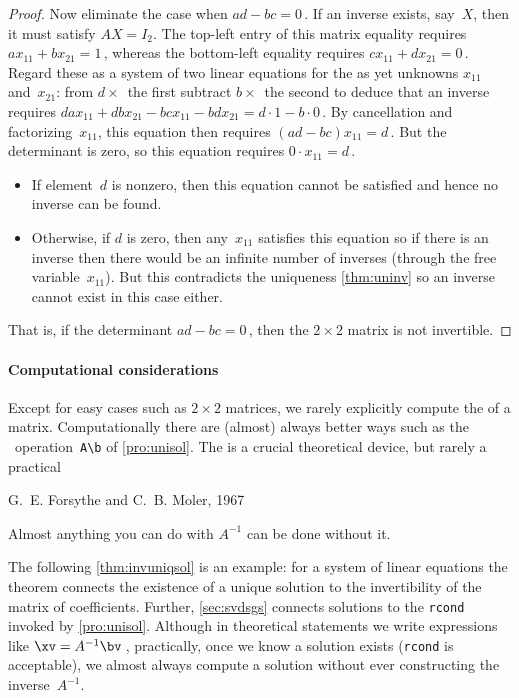 \begin{proof}
Now eliminate the case when \(ad-bc=0\)\,.
If an inverse exists, say~\(X\), then it must satisfy \(AX=I_2\).
The top-left entry of this matrix equality requires \(ax_{11}+bx_{21}=1\)\,, whereas the bottom-left equality requires \(cx_{11}+dx_{21}=0\)\,.
Regard these as a system of two linear equations for the as yet unknowns \(x_{11}\) and~\(x_{21}\): from \(d\times\)~the first subtract \(b\times\)~the second to deduce that an inverse requires
\(dax_{11}+dbx_{21}-bcx_{11}-bdx_{21}=d\cdot1-b\cdot0\)\,.
By cancellation and factorizing~\(x_{11}\), this equation then requires \((ad-bc)x_{11}=d\)\,.
But the determinant is zero, so this equation requires \(0\cdot x_{11}=d\)\,.
\begin{itemize}
\item If element~\(d\) is nonzero, then this equation cannot be satisfied and hence no inverse can be found.
\item Otherwise, if \(d\) is zero, then any~\(x_{11}\) satisfies this equation so if there is an inverse then there would be an infinite number of inverses (through the free variable~\(x_{11}\)).
But this contradicts the uniqueness \cref{thm:uninv} so an inverse cannot exist in this case either.
\end{itemize}
That is, if the determinant \(ad-bc=0\)\,, then the \(2\times2\) matrix is not invertible.
\end{proof}




\paragraph{Computational considerations} 
Except for easy cases such as \(2\times2\) matrices, we rarely explicitly compute the  of a matrix.
Computationally there are (almost) always better ways such as the \script\ operation~\verb|A\b| of \cref{pro:unisol}.
The  is a crucial theoretical device, but rarely a practical 


\begin{quoted}{\parbox[t]{0.5\linewidth}{G.~E. Forsythe and C.~B. Moler, 1967 \cite[p.261]{Higham1996}}}
Almost anything you can do with \(A^{-1}\) can be done without it.
\end{quoted}

The following \cref{thm:invuniqsol} is an example: for a system of linear equations the theorem connects the existence of a unique solution to the invertibility of the matrix of coefficients.
Further, \cref{sec:svdsgs} connects solutions to the \verb|rcond| invoked by \cref{pro:unisol}.
Although in theoretical statements we write expressions like \(\xv=A^{-1}\bv\)\,,
practically, once we know a solution exists (\verb|rcond| is acceptable), we almost always compute a solution without ever constructing the inverse~\(A^{-1}\).



